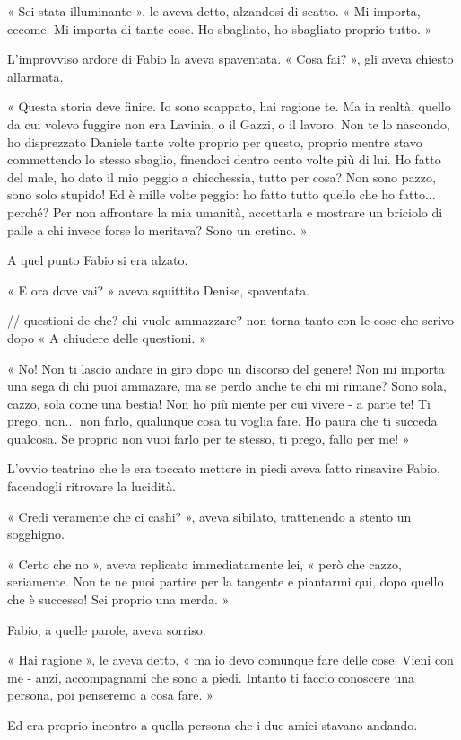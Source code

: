 « Sei stata illuminante », le aveva detto, alzandosi di scatto. « Mi importa, eccome. Mi importa di tante cose. Ho sbagliato, ho sbagliato proprio tutto. »

L'improvviso ardore di Fabio la aveva spaventata. « Cosa fai? », gli aveva chiesto allarmata.

« Questa storia deve finire. Io sono scappato, hai ragione te. Ma in realtà, quello da cui volevo fuggire non era Lavinia, o il Gazzi, o il lavoro. Non te lo nascondo, ho disprezzato Daniele tante volte proprio per questo, proprio mentre stavo commettendo lo stesso sbaglio, finendoci dentro cento volte più di lui. Ho fatto del male, ho dato il mio peggio a chicchessia, tutto per cosa? Non sono pazzo, sono solo stupido! Ed è mille volte peggio: ho fatto tutto quello che ho fatto... perché? Per non affrontare la mia umanità, accettarla e mostrare un briciolo di palle a chi invece forse lo meritava? Sono un cretino. »

A quel punto Fabio si era alzato.

« E ora dove vai? » aveva squittito Denise, spaventata.

// questioni de che? chi vuole ammazzare? non torna tanto con le cose che scrivo dopo
« A chiudere delle questioni. »

« No! Non ti lascio andare in giro dopo un discorso del genere! Non mi importa una sega di chi puoi ammazare, ma se perdo anche te chi mi rimane? Sono sola, cazzo, sola come una bestia! Non ho più niente per cui vivere - a parte te! Ti prego, non... non farlo, qualunque cosa tu voglia fare. Ho paura che ti succeda qualcosa. Se proprio non vuoi farlo per te stesso, ti prego, fallo per me! »

L'ovvio teatrino che le era toccato mettere in piedi aveva fatto rinsavire Fabio, facendogli ritrovare la lucidità.

« Credi veramente che ci cashi? », aveva sibilato, trattenendo a stento un sogghigno.

« Certo che no », aveva replicato immediatamente lei, « però che cazzo, seriamente. Non te ne puoi partire per la tangente e piantarmi qui, dopo quello che è successo! Sei proprio una merda. »

Fabio, a quelle parole, aveva sorriso.

« Hai ragione », le aveva detto, « ma io devo comunque fare delle cose. Vieni con me - anzi, accompagnami che sono a piedi. Intanto ti faccio conoscere una persona, poi penseremo a cosa fare. »

Ed era proprio incontro a quella persona che i due amici stavano andando.

